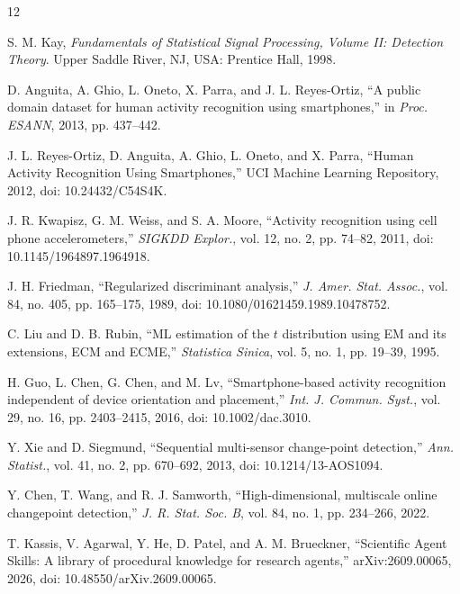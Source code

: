 \documentclass[a4paper,conference,10pt]{IEEEtran}
\begin{document}
\balance
\begin{thebibliography}{12}

S. M. Kay, \emph{Fundamentals of Statistical Signal Processing, Volume II: Detection Theory}. Upper Saddle River, NJ, USA: Prentice Hall, 1998.

D. Anguita, A. Ghio, L. Oneto, X. Parra, and J. L. Reyes-Ortiz, ``A public domain dataset for human activity recognition using smartphones,'' in \emph{Proc. ESANN}, 2013, pp. 437--442.

J. L. Reyes-Ortiz, D. Anguita, A. Ghio, L. Oneto, and X. Parra, ``Human Activity Recognition Using Smartphones,'' UCI Machine Learning Repository, 2012, doi: 10.24432/C54S4K.

J. R. Kwapisz, G. M. Weiss, and S. A. Moore, ``Activity recognition using cell phone accelerometers,'' \emph{SIGKDD Explor.}, vol. 12, no. 2, pp. 74--82, 2011, doi: 10.1145/1964897.1964918.

J. H. Friedman, ``Regularized discriminant analysis,'' \emph{J. Amer. Stat. Assoc.}, vol. 84, no. 405, pp. 165--175, 1989, doi: 10.1080/01621459.1989.10478752.

C. Liu and D. B. Rubin, ``ML estimation of the $t$ distribution using EM and its extensions, ECM and ECME,'' \emph{Statistica Sinica}, vol. 5, no. 1, pp. 19--39, 1995.

H. Guo, L. Chen, G. Chen, and M. Lv, ``Smartphone-based activity recognition independent of device orientation and placement,'' \emph{Int. J. Commun. Syst.}, vol. 29, no. 16, pp. 2403--2415, 2016, doi: 10.1002/dac.3010.

Y. Xie and D. Siegmund, ``Sequential multi-sensor change-point detection,'' \emph{Ann. Statist.}, vol. 41, no. 2, pp. 670--692, 2013, doi: 10.1214/13-AOS1094.

Y. Chen, T. Wang, and R. J. Samworth, ``High-dimensional, multiscale online changepoint detection,'' \emph{J. R. Stat. Soc. B}, vol. 84, no. 1, pp. 234--266, 2022.

T. Kassis, V. Agarwal, Y. He, D. Patel, and A. M. Brueckner, ``Scientific Agent Skills: A library of procedural knowledge for research agents,'' arXiv:2609.00065, 2026, doi: 10.48550/arXiv.2609.00065.

\end{thebibliography}
\end{document}
